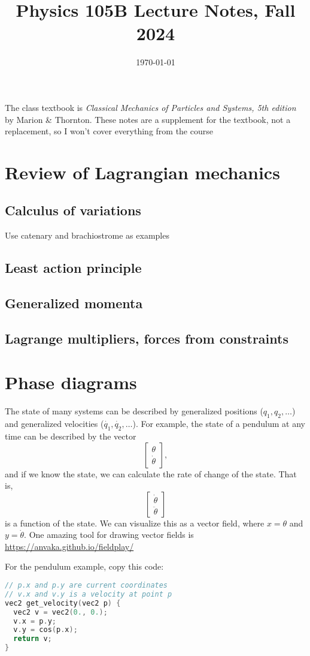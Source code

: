 \documentclass{article}
\date{\today}
\title{Physics 105B Lecture Notes, Fall 2024}
\begin{document}
\maketitle

The class textbook is \textit{Classical Mechanics of Particles and Systems, 5th edition} by Marion \& Thornton. These notes are a supplement for the textbook, not a replacement, so I won't cover everything from the course

\tableofcontents
\section{Review of Lagrangian mechanics}
\subsection{Calculus of variations}
Use catenary and brachiostrome as examples
\subsection{Least action principle}
\subsection{Generalized momenta}
\subsection{Lagrange multipliers, forces from constraints}

\section{Phase diagrams}
The state of many systems can be described by generalized positions ($q_1, q_2, \dots$) and generalized velocities ($\dot{q_1}, \dot{q_2}, \dots$). For example, the state of a pendulum at any time can be described by the vector
\[ \begin{bmatrix}
    \theta \\
    \dot{\theta}
\end{bmatrix}, \]
and if we know the state, we can calculate the rate of change of the state. That is,
\[ \begin{bmatrix}
    \dot{\theta} \\
    \ddot{\theta}
\end{bmatrix} \]
is a function of the state. We can visualize this as a vector field, where $x = \theta$ and $y = \dot{\theta}$. One amazing tool for drawing vector fields is
\url{https://anvaka.github.io/fieldplay/}
\par
For the pendulum example, copy this code:
\begin{lstlisting}[language=C]
// p.x and p.y are current coordinates
// v.x and v.y is a velocity at point p
vec2 get_velocity(vec2 p) {
  vec2 v = vec2(0., 0.);
  v.x = p.y;
  v.y = cos(p.x);
  return v;
}
\end{lstlisting}
\end{document}
